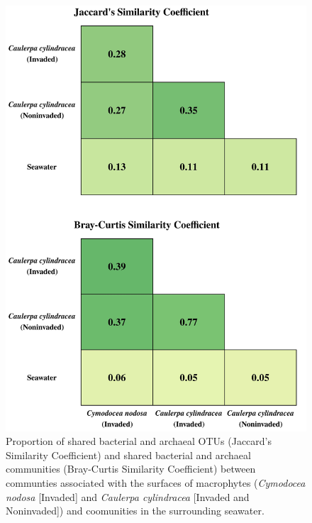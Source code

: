 \documentclass[12pt,]{article}
\begin{document}
\begin{figure}[H]

{\centering \includegraphics[width=0.7\linewidth]{../results/figures/matrix} 

}

\caption{Proportion of shared bacterial and archaeal OTUs (Jaccard's Similarity Coefficient) and shared bacterial and archaeal communities (Bray-Curtis Similarity Coefficient) between communties associated with the surfaces of macrophytes (\textit{Cymodocea nodosa} [Invaded] and \textit{Caulerpa cylindracea} [Invaded and Noninvaded]) and coomunities in the surrounding seawater.\label{matrix}}\label{fig:unnamed-chunk-3}
\end{figure}
\end{document}
